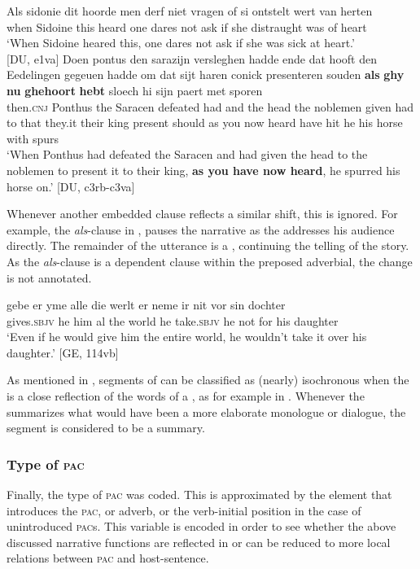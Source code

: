 \documentclass[output=paper,colorlinks,citecolor=brown]{langscibook}
\begin{document}
\ea
\ea \label{ex:shift}
\gll Als sidonie dit hoorde men derf niet vragen of si ontstelt wert van herten\\
when Sidoine this heard one dares not ask if she distraught was of heart\\
\glt `When Sidoine heared this, one dares not ask if she was sick at heart.'\\ \hfill [DU, e1va]
\ex \label{narrsp}
\gll Doen pontus den sarazijn versleghen hadde ende dat hooft den Eedelingen gegeuen hadde om dat sijt haren conick presenteren souden \textbf{als} \textbf{ghy} \textbf{nu} \textbf{ghehoort} \textbf{hebt} sloech hi sijn paert met sporen\\
then.\textsc{cnj} Ponthus the Saracen defeated had and the head the noblemen given had to that they.it their king present should as you now heard have hit he his horse with spurs\\
\glt `When Ponthus had defeated the Saracen and had given the head to the noblemen to present it to their king, \textbf{as you have now heard}, he spurred his horse on.' \hfill [DU, c3rb-c3va]
\z
\z

\noindent Whenever another embedded clause reflects a similar shift, this is ignored. For example, the \textit{als}-clause in , pauses the narrative as the  addresses his audience directly. The remainder of the utterance is a , continuing the telling of the story. As the \textit{als}-clause is a dependent clause within the preposed adverbial, the change is not annotated.

\ea \label{ex:iso}
\gll gebe er yme alle die werlt er neme ir nit vor sin dochter\\
gives.\textsc{sbjv} he him al the world he take.\textsc{sbjv} he not for his daughter\\
\glt `Even if he would give him the entire world, he wouldn't take it over his daughter.' \hfill [GE, 114vb]
\z

As mentioned in , segments of  can be classified as (nearly) isochronous when the  is a close reflection of the words of a , as for example in . Whenever the  summarizes what would have been a more elaborate monologue or dialogue, the segment is considered to be a summary.


\subsubsection{Type of \textsc{pac}}\label{sec:3.3.3}
Finally, the type of \textsc{pac} was coded. This is approximated by the element that introduces the \textsc{pac},  or adverb, or the verb-initial position in the case of unintroduced \textsc{pac}s. This variable is encoded in order to see whether the above discussed narrative functions are reflected in or can be reduced to more local relations between \textsc{pac} and host-sentence. 
\end{document}
